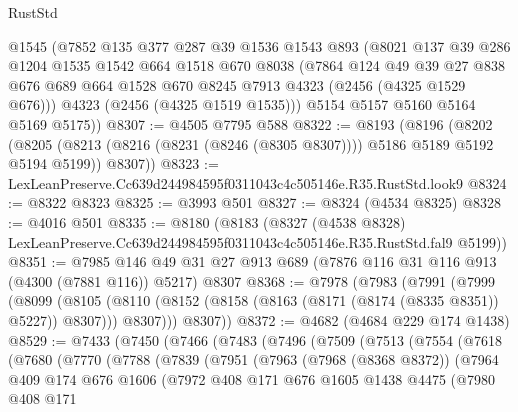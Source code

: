 \begin{lexlean}{RustStd}
\begin{coremodule}
      @1545
      (@7852
        @135
        @377
        @287
        @39
        @1536
        @1543
        @893
        (@8021
          @137
          @39
          @286
          @1204
          @1535
          @1542
          @664
          @1518
          @670
          @8038
          (@7864
            @124
            @49
            @39
            @27
            @838
            @676
            @689
            @664
            @1528
            @670
            @8245
            @7913
            @4323
            (@2456 (@4325 @1529 @676)))
          @4323
          (@2456 (@4325 @1519 @1535)))
        @5154
        @5157
        @5160
        @5164
        @5169
        @5175))
@8307 := @4505 @7795 @588
@8322 := @8193
    (@8196
      (@8202
        (@8205 (@8213 (@8216 (@8231 (@8246 (@8305 @8307)))) @5186 @5189 @5192 @5194 @5199))
        @8307))
@8323 := LexLeanPreserve.Cc639d244984595f0311043c4c505146e.R35.RustStd.look9
@8324 := @8322 @8323
@8325 := @3993 @501
@8327 := @8324 (@4534 @8325)
@8328 := @4016 @501
@8335 := @8180
    (@8183
      (@8327
        (@4538 @8328)
        LexLeanPreserve.Cc639d244984595f0311043c4c505146e.R35.RustStd.fal9
        @5199))
@8351 := @7985
    @146
    @49
    @31
    @27
    @913
    @689
    (@7876 @116 @31 @116 @913 (@4300 (@7881 @116)) @5217)
    @8307
@8368 := @7978
    (@7983
      (@7991
        (@7999
          (@8099
            (@8105
              (@8110 (@8152 (@8158 (@8163 (@8171 (@8174 (@8335 @8351)) @5227)) @8307)))
              @8307)))
        @8307))
@8372 := @4682 (@4684 @229 @174 @1438)
@8529 := @7433
    (@7450
      (@7466
        (@7483
          (@7496
            (@7509
              (@7513
                (@7554
                  (@7618
                    (@7680
                      (@7770
                        (@7788
                          (@7839
                            (@7951
                              (@7963
                                (@7968 (@8368 @8372))
                                (@7964
                                  @409
                                  @174
                                  @676
                                  @1606
                                  (@7972
                                    @408
                                    @171
                                    @676
                                    @1605
                                    @1438
                                    @4475
                                    (@7980
                                      @408
                                      @171

\end{coremodule}
\end{lexlean}

